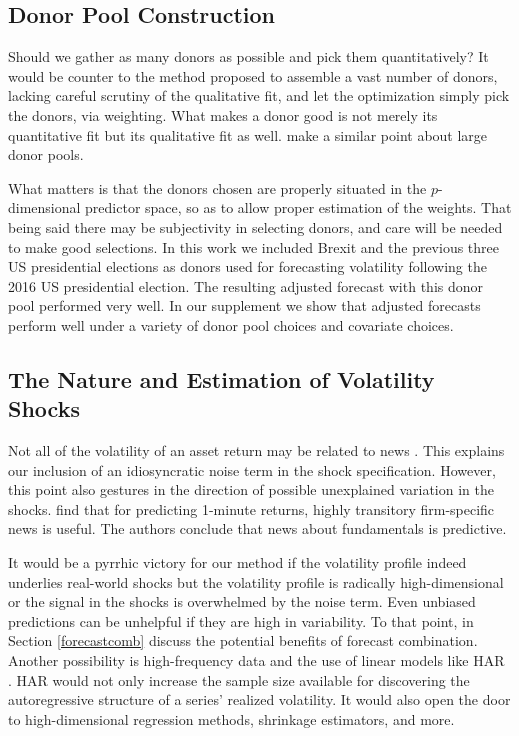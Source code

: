 \documentclass{uiucthesis2021}
\theoremstyle{definition}
\begin{document}
\subsection{Donor Pool Construction}

Should we gather as many donors as possible and pick them quantitatively?  It would be counter to the method proposed to assemble a vast number of donors, lacking careful scrutiny of the qualitative fit, and let the optimization simply pick the donors, via weighting.  What makes a donor good is not merely its quantitative fit but its qualitative fit as well.  \cite[][]{abadie2022synthetic} make a similar point about large donor pools.  

What matters is that the donors chosen are properly situated in the $p$-dimensional predictor space, so as to allow proper estimation of the weights.  %
That being said there may be subjectivity in selecting donors, and care will be needed to make good selections. In this work we included Brexit and the previous three US presidential elections as donors used for forecasting volatility following the 2016 US presidential election. The resulting adjusted forecast with this donor pool performed very well. In our supplement we show that adjusted forecasts perform well under a variety of donor pool choices and covariate choices.

\subsection{The Nature and Estimation of Volatility Shocks}

Not all of the volatility of an asset return may be related to news \cite[][]{boudoukh2019information}.  This explains our inclusion of an idiosyncratic noise term in the shock specification.  However, this point also gestures in the direction of possible unexplained variation in the shocks.  \cite[][]{chinco2019sparse} find that for predicting 1-minute returns, highly transitory firm-specific news is useful.  The authors conclude that news about fundamentals is predictive.

It would be a pyrrhic victory for our method if the volatility profile indeed underlies real-world shocks but the volatility profile is radically high-dimensional or the signal in the shocks is overwhelmed by the noise term.  Even unbiased predictions can be unhelpful if they are high in variability.  To that point, in Section \ref{forecastcomb} discuss the potential benefits of forecast combination.  Another possibility is high-frequency data and the use of linear models like HAR \cite[][]{corsi2012har}.  HAR would not only increase the sample size available for discovering the autoregressive structure of a series' realized volatility.  It would also open the door to high-dimensional regression methods, shrinkage estimators, and more.
\end{document}
